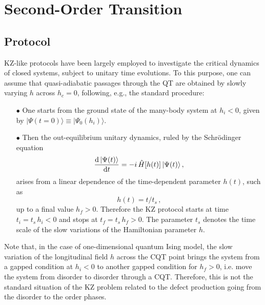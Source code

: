 \section{Second-Order Transition}
\label{rtripcqt}

\subsection{Protocol}

KZ-like protocols have been largely employed to investigate the
critical dynamics of closed systems, subject to unitary time
evolutions.  To this purpose, one can assume that quasi-adiabatic
passages through the QT are obtained by slowly varying $h$ across $h_c
= 0$, following, e.g., the standard procedure:

\begin{itemize}
\item[$\bullet$] One starts from the ground state of the many-body system at
  $h_i < 0$, given by $|\Psi(t=0)\rangle \equiv |\Psi_0(h_i)\rangle$.
  
\item[$\bullet$] Then the out-equilibrium unitary dynamics, ruled by the
  Schr\"odinger equation
  \begin{equation}
    {{\rm d} \, |\Psi(t)\rangle \over {\rm d} t} =
    - i \, \hat H[h(t)] \, |\Psi(t)\rangle \,,
    \label{unitdyn}
  \end{equation}
  arises from a linear dependence of the time-dependent parameter
  $h(t)$, such as
  \begin{equation}
    h(t) = t/t_s \,,
    \label{wtkz}
  \end{equation}
  up to a final value $h_f>0$. Therefore the KZ protocol starts at
  time $t_i = t_s \, h_i<0$ and stops at $t_f= t_s \, h_f>0$.  The
  parameter $t_s$ denotes the time scale of the slow variations of the
  Hamiltonian parameter $h$.

\end{itemize}

Note that, in the case of one-dimensional quantum Ising model, the
slow variation of the longitudinal field $h$ across the CQT point
brings the system from a gapped condition at $h_i<0$ to another gapped
condition for $h_f>0$, i.e. move the system from disorder to disorder
through a CQT. Therefore, this is not the standard situation of the KZ
problem related to the defect production going from the disorder to
the order phases.

